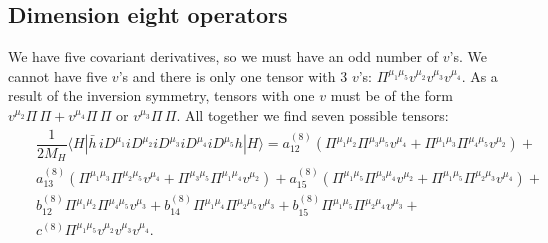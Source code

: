 \subsection{Dimension eight operators}\label{sec:dim_8_SI}
We have five covariant derivatives, so we must have an odd number of $v$'s. We cannot have five $v$'s and there is only one tensor with 3 $v$'s: $\Pi^{\mu_1\mu_5}v^{\mu_2} v^{\mu_3}v^{\mu_4}$. As a result of the inversion symmetry, tensors with one $v$ must be of the form $v^{\mu_2}\Pi\,\Pi+v^{\mu_4}\Pi\,\Pi$ or  $v^{\mu_3}\Pi\,\Pi$.   All together we find seven possible tensors:
\vspace{-0.5cm}
\begin{eqnarray}\label{eqn:chap4_dim8_SI_decomp}
&&\dfrac1{2M_H}\langle H |\bar h\, iD^{\mu_1}iD^{\mu_2}iD^{\mu_3}iD^{\mu_4}iD^{\mu_5}h|H\rangle=a_{12}^{(8)}\left(\Pi^{\mu_1\mu_2}\Pi^{\mu_3\mu_5}v^{\mu_4}+\Pi^{\mu_1\mu_3}\Pi^{\mu_4\mu_5}v^{\mu_2}\right)+\nonumber\\
&&a_{13}^{(8)}\left(\Pi^{\mu_1\mu_3}\Pi^{\mu_2\mu_5}v^{\mu_4}+\Pi^{\mu_3\mu_5}\Pi^{\mu_1\mu_4}v^{\mu_2}\right)+a_{15}^{(8)}\left(\Pi^{\mu_1\mu_5}\Pi^{\mu_3\mu_4}v^{\mu_2}+\Pi^{\mu_1\mu_5}\Pi^{\mu_2\mu_3}v^{\mu_4}\right)+\nonumber\\
&&b_{12}^{(8)}\Pi^{\mu_1\mu_2}\Pi^{\mu_4\mu_5}v^{\mu_3}+b_{14}^{(8)}\Pi^{\mu_1\mu_4}\Pi^{\mu_2\mu_5}v^{\mu_3}+b_{15}^{(8)}\Pi^{\mu_1\mu_5}\Pi^{\mu_2\mu_4}v^{\mu_3}+\nonumber\\
&&c^{(8)}\Pi^{\mu_1\mu_5}v^{\mu_2}v^{\mu_3}v^{\mu_4}.
\end{eqnarray}

